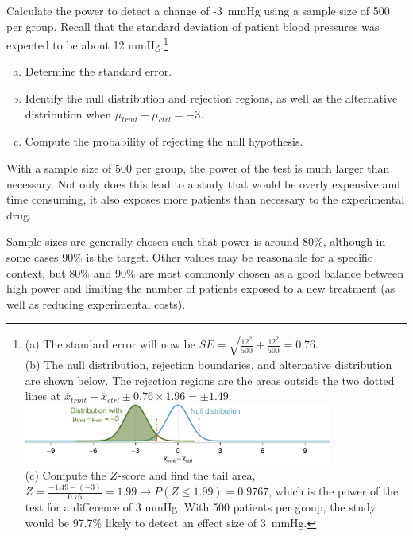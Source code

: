 \begin{exercise}
Calculate the power to detect a change of -3~mmHg  using a sample size of 500 per group. Recall that the standard deviation of patient blood pressures was expected to be about 12 mmHg.\footnote{(a) The standard error will now be $SE = \sqrt{\frac{12^2}{500} + \frac{12^2}{500}} = 0.76$.\\
(b) The null distribution, rejection boundaries, and alternative distribution are shown below. The rejection regions are the areas outside the two dotted lines at $\overline{x}_{trmt} - \overline{x}_{ctrl} \pm 0.76 \times 1.96 = \pm 1.49$. \\
\includegraphics[width=0.8\textwidth]{ch_inference_for_means_oi_biostat/figures/power_null_0_0-76/power_null_0_0-76_with_alt_at_3_and_shaded} \\
(c) Compute the $Z$-score and find the tail area, $Z = \frac{-1.49 - (-3)}{0.76} = 1.99 \to P(Z \leq 1.99) = 0.9767$, which is the power of the test for a difference of 3 mmHg. With 500 patients per group, the study would be 97.7\% likely to detect an effect size of 3~mmHg.}
\begin{enumerate}[(a)]
\setlength{\itemsep}{0mm}
\item Determine the standard error.
\item Identify the null distribution and rejection regions, as well as the alternative distribution when $\mu_{trmt} - \mu_{ctrl} = -3$.
\item Compute the probability of rejecting the null hypothesis.
\end{enumerate}
\end{exercise}

With a sample size of 500 per group, the power of the test is much larger than necessary. Not only does this lead to a study that would be overly expensive and time consuming, it also exposes more patients than necessary to the experimental drug. 

Sample sizes are generally chosen such that power is around 80\%, although in some cases 90\% is the target. Other values may be reasonable for a specific context, but 80\% and 90\% are most commonly chosen as a good balance between high power and limiting the number of patients exposed to a new treatment (as well as reducing experimental costs). 


